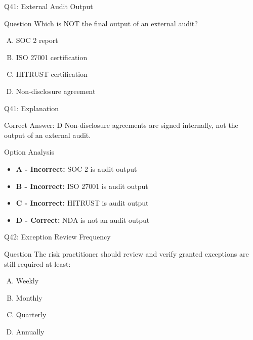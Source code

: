 \documentclass{beamer}
\begin{document}
	\begin{frame}{Q41: External Audit Output}
		\begin{block}{Question}
			Which is NOT the final output of an external audit?
		\end{block}
		\begin{enumerate}[(A)]
			\item SOC 2 report
			\item ISO 27001 certification
			\item HITRUST certification
			\item Non-disclosure agreement
		\end{enumerate}
	\end{frame}
	
	\begin{frame}{Q41: Explanation}
		\begin{block}{Correct Answer: D}
			Non-disclosure agreements are signed internally, not the output of an external audit.
		\end{block}
		\begin{block}{Option Analysis}
			\begin{itemize}
				\item \textbf{A - Incorrect:} SOC 2 is audit output
				\item \textbf{B - Incorrect:} ISO 27001 is audit output
				\item \textbf{C - Incorrect:} HITRUST is audit output
				\item \textbf{D - Correct:} NDA is not an audit output
			\end{itemize}
		\end{block}
	\end{frame}
	
	\begin{frame}{Q42: Exception Review Frequency}
		\begin{block}{Question}
			The risk practitioner should review and verify granted exceptions are still required at least:
		\end{block}
		\begin{enumerate}[(A)]
			\item Weekly
			\item Monthly
			\item Quarterly
			\item Annually
		\end{enumerate}
	\end{frame}
	
\end{document}
